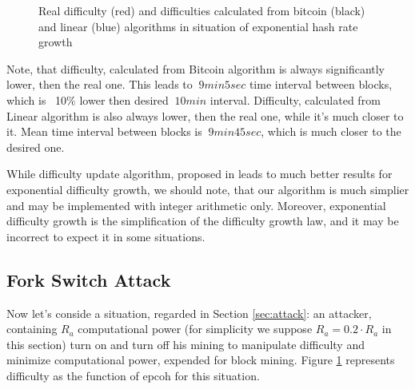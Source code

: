 \documentclass[number,preprint,review]{elsarticle}
\begin{document}
\begin{figure}[h]
\caption{Real difficulty (red) and difficulties calculated from bitcoin (black) and linear (blue) algorithms in situation of exponential hash rate growth}
\label{fig:exp}
\end{figure}

Note, that difficulty, calculated from Bitcoin algorithm is always significantly lower, then the real one.
This leads to \(~ 9 min 5 sec\) time interval between blocks, which is ~10\% lower then desired \(~ 10 min\) interval.
Difficulty, calculated from Linear algorithm is also always lower, then the real one, while it's much closer to it.
Mean time interval between blocks is \(~ 9 min 45 sec\), which is much closer to the desired one.

While difficulty update algorithm, proposed in \cite{kraft2015difficulty} leads to much better results for exponential difficulty growth, we should note, that our algorithm is much simplier and may be implemented with integer arithmetic only.
Moreover, exponential difficulty growth is the simplification of the difficulty growth law, and it may be incorrect to expect it in some situations.

\subsection{Fork Switch Attack}

Now let's conside a situation, regarded in Section \ref{sec:attack}: an attacker, containing \(R_a\) computational power (for simplicity we suppose \(R_a=0.2 \cdot R_a \) in this section) turn on and turn off his mining to manipulate difficulty and minimize computational power, expended for block mining.
Figure \ref{fig:exp} represents difficulty as the function of epcoh for this situation.
\end{document}
